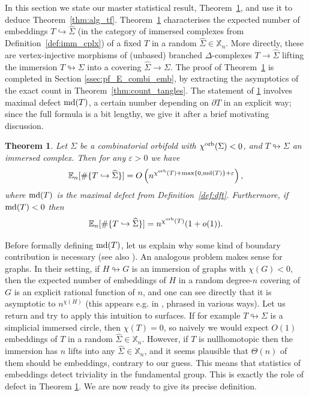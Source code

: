 \documentclass{amsart}
\newtheorem{theorem}[conjecture]{Theorem}
\newcommand{\cho}{\chi^{\textnormal{orb}}}
\newcommand{\covers}{\mathbb{X}_n}
\newcommand{\md}{\textnormal{md}}
\newcommand{\whS}{{\widehat{\Sigma}}}
\begin{document}
In this section we state our master statistical result, Theorem~\ref{thm:E_combi_emb}, and use it to deduce Theorem~\ref{thm:alg_tf}. Theorem~\ref{thm:E_combi_emb} characterises the expected number of embeddings $T\hookrightarrow\whS$ (in the category of immersed complexes from Definition~\ref{def:imm_cplx}) of a fixed $T$ in a random $\whS\in\covers$. More directly, these are vertex-injective morphisms of (unbased) branched $\Delta$-complexes $T\to\whS$ lifting the immersion $T\looparrowright\Sigma$ into a covering $\whS\to\Sigma$. The proof of Theorem~\ref{thm:E_combi_emb} is completed in Section \ref{ssec:pf_E_combi_emb}, by extracting the asymptotics of the exact count in Theorem~\ref{thm:count_tangles}. The statement of \ref{thm:E_combi_emb} involves maximal defect $\md(T)$, a certain number depending on $\partial T$ in an explicit way; since the full formula is a bit lengthy, we give it after a brief motivating discussion.
\begin{theorem}\label{thm:E_combi_emb}
Let $\Sigma$ be a combinatorial orbifold with $\cho(\Sigma)<0$, and $T\looparrowright\Sigma$ an immersed complex. Then for any $\varepsilon>0$ we have
\begin{equation*}
\mathbb{E}_n[\#\{T\hookrightarrow\whS\}]=O\left(n^{\cho(T)+\max\{0,\md(T)\}+\varepsilon}\right),
\end{equation*}
where $\md(T)$ is the maximal defect from Definition~\ref{def:dft}. Furthermore, if $\md(T)<0$ then
\begin{equation*}
\mathbb{E}_n[\#\{T\hookrightarrow\whS\}]=n^{\cho(T)}(1+o(1)).
\end{equation*}
\end{theorem}
Before formally defining $\md(T)$, let us explain why some kind of boundary contribution is necessary (see also \cite[discussion of (1.7) in \S 1.6]{asymptotic_stats_random_covering_surfaces_MageePuder23}). An analogous problem makes sense for graphs. In their setting, if $H\looparrowright G$ is an immersion of graphs with $\chi(G)<0$, then the expected number of embeddings of $H$ in a random degree-$n$ covering of $G$ is an explicit rational function of $n$, and one can see directly that it is asymptotic to $n^{\chi(H)}$ (this appears e.g. in \cites[Lemma 6.4]{meas_preserving_words_primitive_PuderParzanchevski15}[Lemma 3.1]{local_stats_random_perms_free_prods_PuderZimhoni24}[Lemma 6.4]{tanglefree_perms_PW_property_random_covers_KlukowskiMarkovic24}, phrased in various ways). Let us return and try to apply this intuition to surfaces. If for example $T\looparrowright\Sigma$ is a simplicial immersed circle, then $\chi(T)=0$, so naively we would expect $O(1)$ embeddings of $T$ in a random $\whS\in\covers$. However, if $T$ is nullhomotopic then the immersion has $n$ lifts into any $\whS\in\covers$, and it seems plausible that $\Theta(n)$ of them should be embeddings, contrary to our guess. This means that statistics of embeddings detect triviality in the fundamental group. This is exactly the role of defect in Theorem \ref{thm:E_combi_emb}. We are now ready to give its precise definition.
\end{document}
